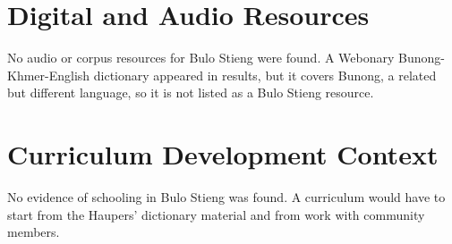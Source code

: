 \documentclass[12pt]{article}
\begin{document}
\section{Digital and Audio Resources}
No audio or corpus resources for Bulo Stieng were found. A Webonary Bunong-Khmer-English dictionary appeared in results, but it covers Bunong, a related but different language, so it is not listed as a Bulo Stieng resource.

\section{Curriculum Development Context}
No evidence of schooling in Bulo Stieng was found. A curriculum would have to start from the Haupers' dictionary material and from work with community members.
\end{document}
